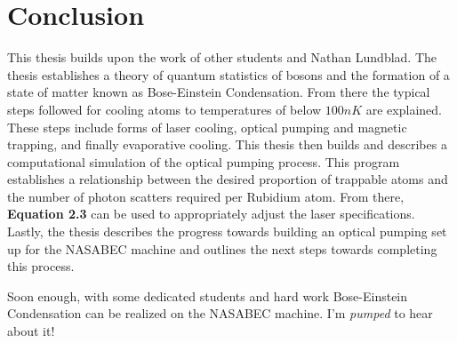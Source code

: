 \chapter*{Conclusion}
This thesis builds upon the work of other students and Nathan Lundblad. The thesis establishes a theory of quantum statistics of bosons and the formation of a state of matter known as Bose-Einstein Condensation. From there the typical steps followed for cooling atoms to temperatures of below $100nK$ are explained. These steps include forms of laser cooling, optical pumping and magnetic trapping, and finally evaporative cooling. This thesis then builds and describes a computational simulation of the optical pumping process. This program establishes a relationship between the desired proportion of trappable atoms and the number of photon scatters required per Rubidium atom. From there, \textbf{Equation 2.3} can be used to appropriately adjust the laser specifications. Lastly, the thesis describes the progress towards building an optical pumping set up for the NASABEC machine and outlines the next steps towards completing this process. 

Soon enough, with some dedicated students and hard work Bose-Einstein Condensation can be realized on the NASABEC machine. I'm \textit{pumped} to hear about it!













\nocite{*}